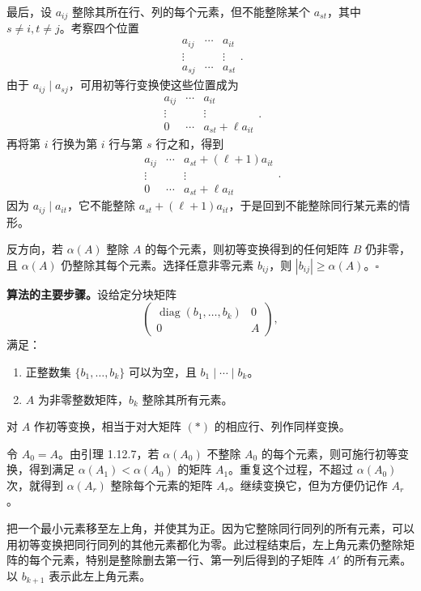 最后，设 $a_{ij}$ 整除其所在行、列的每个元素，但不能整除某个 $a_{st}$，其中 $s\ne i,t\ne j$。考察四个位置
\[
\begin{matrix}a_{ij}&\cdots&a_{it}\\\vdots&&\vdots\\a_{sj}&\cdots&a_{st}\end{matrix}.
\]
由于 $a_{ij}\mid a_{sj}$，可用初等行变换使这些位置成为
\[
\begin{matrix}a_{ij}&\cdots&a_{it}\\\vdots&&\vdots\\0&\cdots&a_{st}+\ell a_{it}\end{matrix}.
\]
再将第 $i$ 行换为第 $i$ 行与第 $s$ 行之和，得到
\[
\begin{matrix}a_{ij}&\cdots&a_{st}+(\ell+1)a_{it}\\\vdots&&\vdots\\0&\cdots&a_{st}+\ell a_{it}\end{matrix}.
\]
因为 $a_{ij}\mid a_{it}$，它不能整除 $a_{st}+(\ell+1)a_{it}$，于是回到不能整除同行某元素的情形。

反方向，若 $\alpha(A)$ 整除 $A$ 的每个元素，则初等变换得到的任何矩阵 $B$ 仍非零，且 $\alpha(A)$ 仍整除其每个元素。选择任意非零元素 $b_{ij}$，则 $|b_{ij}|\geq\alpha(A)$。\hfill$\square$

\noindent\textbf{算法的主要步骤。}设给定分块矩阵
\[
\begin{pmatrix}\operatorname{diag}(b_1,\ldots,b_k)&0\\0&A\end{pmatrix},\tag{$*$}
\]
满足：
\begin{enumerate}[label=(\arabic*)]
\item 正整数集 $\{b_1,\ldots,b_k\}$ 可以为空，且 $b_1\mid\cdots\mid b_k$。
\item $A$ 为非零整数矩阵，$b_k$ 整除其所有元素。
\end{enumerate}
对 $A$ 作初等变换，相当于对大矩阵 $(*)$ 的相应行、列作同样变换。

令 $A_0=A$。由引理 1.12.7，若 $\alpha(A_0)$ 不整除 $A_0$ 的每个元素，则可施行初等变换，得到满足 $\alpha(A_1)<\alpha(A_0)$ 的矩阵 $A_1$。重复这个过程，不超过 $\alpha(A_0)$ 次，就得到 $\alpha(A_r)$ 整除每个元素的矩阵 $A_r$。继续变换它，但为方便仍记作 $A_r$。

把一个最小元素移至左上角，并使其为正。因为它整除同行同列的所有元素，可以用初等变换把同行同列的其他元素都化为零。此过程结束后，左上角元素仍整除矩阵的每个元素，特别是整除删去第一行、第一列后得到的子矩阵 $A'$ 的所有元素。以 $b_{k+1}$ 表示此左上角元素。

